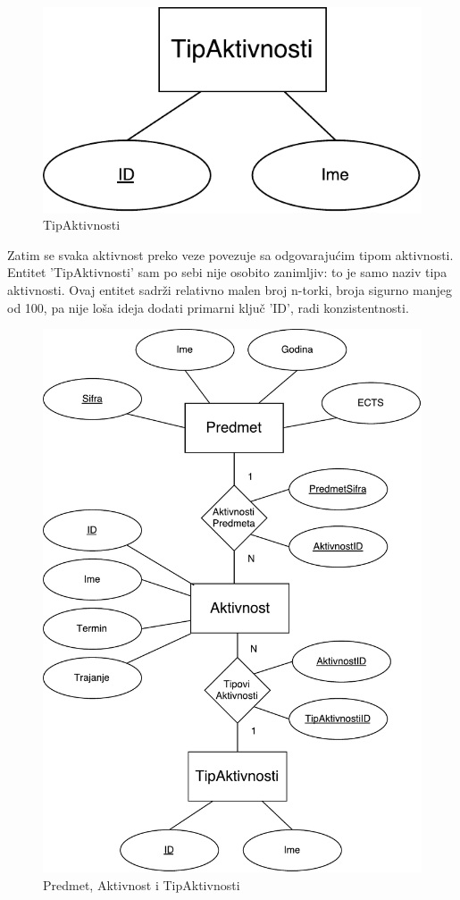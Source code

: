 \documentclass[times, utf8, zavrsni]{fer}
\begin{document}
\begin{figure}[H]
\centering
\includegraphics[scale=0.8]{img/tip-aktivnosti.pdf}
\caption{TipAktivnosti}
\label{fig:tip-aktivnosti}
\end{figure}

Zatim se svaka aktivnost preko veze povezuje sa odgovarajućim tipom aktivnosti. Entitet 'TipAktivnosti' sam po sebi nije osobito zanimljiv: to je samo naziv tipa aktivnosti. Ovaj entitet sadrži relativno malen broj n-torki, broja sigurno manjeg od 100, pa nije loša ideja dodati primarni ključ 'ID', radi konzistentnosti.

\begin{figure}[H]
\centering
\includegraphics[scale=0.55]{img/predmet-aktivnost-tip.pdf}
\caption{Predmet, Aktivnost i TipAktivnosti}
\label{fig:predmet-aktivnost-tip}
\end{figure}\clearpage
\end{document}
